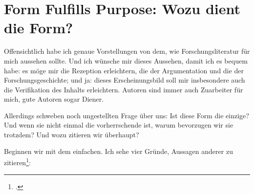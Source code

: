 %
%
%



\section{Form Fulfills Purpose: Wozu dient die Form?}

Offensichtlich habe ich genaue Vorstellungen von dem, wie Forschungsliteratur
für mich aussehen sollte. Und ich wünsche mir dieses Aussehen, damit ich es
bequem habe: es möge mir die Rezeption erleichtern, die der Argumentation und
die der Forschungsgeschichte; und ja: dieses Erscheinungsbild soll mir
insbesondere auch die Verifikation des Inhalts erleichtern. Autoren sind immer
auch Zuarbeiter für mich, gute Autoren sogar Diener.

Allerdings schweben noch ungestellten Frage über uns: Ist diese Form die
einzige? Und wenn sie nicht einmal die vorherrschende ist, warum bevorzugen wir
sie trotzdem? Und wozu zitieren wir überhaupt?

Beginnen wir mit dem einfachen. Ich sehe vier Gründe, Aussagen anderer zu
zitieren\footcite[vgl. dazu auch][187. Die Autoren beschreiben die
Funktionen ähnlich, legen aber andere Schwer\-punk\-te: So läuft
das, was ich als affirmatives Zitat bezeichnen, bei ihnen als
'Bestätigung wissenschaftlicher Thesen durch anerkannte
Autoritäten oder Arbeiten', während das, was ich als
'konfrontatives Zitat' bezeichne, bei Ihnen nicht vorkommt]{RueStaFra1980a}:

